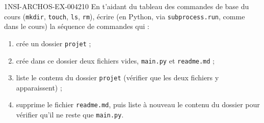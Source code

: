 \begin{exercice}{1NSI-ARCHOS-EX-004}{2}{10}
En t'aidant du tableau des commandes de base du cours (\lstinline{mkdir}, \lstinline{touch},
\lstinline{ls}, \lstinline{rm}), écrire (en Python, via \lstinline{subprocess.run}, comme
dans le cours) la séquence de commandes qui :
\begin{enumerate}
  \item crée un dossier \lstinline{projet} ;
  \item crée dans ce dossier deux fichiers vides, \lstinline{main.py} et \lstinline{readme.md} ;
  \item liste le contenu du dossier \lstinline{projet} (vérifier que les deux fichiers y apparaissent) ;
  \item supprime le fichier \lstinline{readme.md}, puis liste à nouveau le contenu du dossier pour vérifier qu'il ne reste que \lstinline{main.py}.
\end{enumerate}
\end{exercice}

